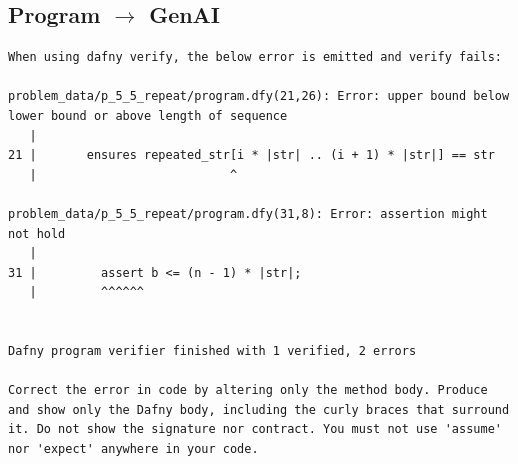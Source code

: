 \documentclass{article}
\begin{document}
\subsection*{Program $\rightarrow$ GenAI}
\begin{lstlisting}
When using dafny verify, the below error is emitted and verify fails:

problem_data/p_5_5_repeat/program.dfy(21,26): Error: upper bound below lower bound or above length of sequence
   |
21 |       ensures repeated_str[i * |str| .. (i + 1) * |str|] == str
   |                           ^

problem_data/p_5_5_repeat/program.dfy(31,8): Error: assertion might not hold
   |
31 |         assert b <= (n - 1) * |str|;
   |         ^^^^^^


Dafny program verifier finished with 1 verified, 2 errors

Correct the error in code by altering only the method body. Produce and show only the Dafny body, including the curly braces that surround it. Do not show the signature nor contract. You must not use 'assume' nor 'expect' anywhere in your code.
\end{lstlisting}
\end{document}
